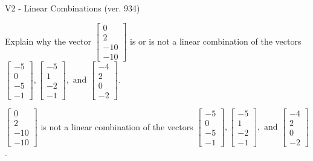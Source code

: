 \begin{exercise}
  \begin{exerciseTitle}V2 - Linear Combinations (ver. 934)\end{exerciseTitle}
  \begin{exerciseStatement}
    Explain why the vector \(\left[\begin{array}{c}
0 \\
2 \\
-10 \\
-10
\end{array}\right]\)  is or is not a linear 
	combination of the vectors \(\left[\begin{array}{c}
-5 \\
0 \\
-5 \\
-1
\end{array}\right] , \left[\begin{array}{c}
-5 \\
1 \\
-2 \\
-1
\end{array}\right] , \text{ and } \left[\begin{array}{c}
-4 \\
2 \\
0 \\
-2
\end{array}\right]\).
	


  \end{exerciseStatement}
  \begin{exerciseAnswer}
   \(\left[\begin{array}{c}
0 \\
2 \\
-10 \\
-10
\end{array}\right]\) 
  	 is not  
	a linear combination of the vectors \(\left[\begin{array}{c}
-5 \\
0 \\
-5 \\
-1
\end{array}\right] , \left[\begin{array}{c}
-5 \\
1 \\
-2 \\
-1
\end{array}\right] , \text{ and } \left[\begin{array}{c}
-4 \\
2 \\
0 \\
-2
\end{array}\right]\).

	
  


  \end{exerciseAnswer}
\end{exercise}